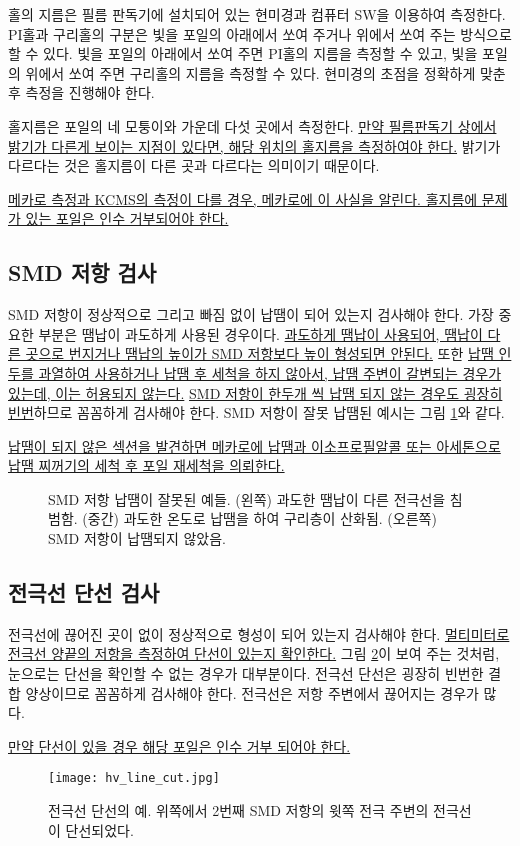 홀의 지름은 필름 판독기에 설치되어 있는 현미경과 컴퓨터 SW을 이용하여 측정한다. PI홀과 구리홀의 구분은 빛을 포일의 아래에서 쏘여 주거나 위에서 쏘여 주는 방식으로 할 수 있다. 빛을 포일의 아래에서 쏘여 주면 PI홀의 지름을 측정할 수 있고, 빛을 포일의 위에서 쏘여 주면 구리홀의 지름을 측정할 수 있다. 현미경의 초점을 정확하게 맞춘 후 측정을 진행해야 한다.

홀지름은 포일의 네 모퉁이와 가운데 다섯 곳에서 측정한다. \uline{만약 필름판독기 상에서 밝기가 다른게 보이는 지점이 있다면, 해당 위치의 홀지름을 측정하여야 한다.} 밝기가 다르다는 것은 홀지름이 다른 곳과 다르다는 의미이기 때문이다. 

\uline{메카로 측정과 KCMS의 측정이 다를 경우, 메카로에 이 사실을 알린다. 홀지름에 문제가 있는 포일은 인수 거부되어야 한다.}

\subsection{SMD 저항 검사}
SMD 저항이 정상적으로 그리고 빠짐 없이 납땜이 되어 있는지 검사해야 한다. 가장 중요한 부분은 땜납이 과도하게 사용된 경우이다. \uline{과도하게 땜납이 사용되어, 땜납이 다른 곳으로 번지거나 땜납의 높이가 SMD 저항보다 높이 형성되면 안된다.} 또한 \uline{납땜 인두를 과열하여 사용하거나 납땜 후 세척을 하지 않아서, 납땜 주변이 갈변되는 경우가 있는데, 이는 허용되지 않는다.} \uline{SMD 저항이 한두개 씩 납땜 되지 않는 경우도 굉장히 빈번}하므로 꼼꼼하게 검사해야 한다. SMD 저항이 잘못 납땜된 예시는 그림 \ref{fig:bad_solder}와 같다.

\uline{납땜이 되지 않은 섹션을 발견하면 메카로에 납땜과 이소프로필알콜 또는 아세톤으로 납땜 찌꺼기의 세척 후 포일 재세척을 의뢰한다.}

\begin{figure}[htb]
  \centering
  \caption[SMD 저항 납땜이 잘못된 예]{SMD 저항 납땜이 잘못된 예들. (왼쪽) 과도한 땜납이 다른 전극선을 침범함. (중간) 과도한 온도로 납땜을 하여 구리층이 산화됨. (오른쪽) SMD 저항이 납땜되지 않았음.}
  \label{fig:bad_solder}
\end{figure}

\subsection{전극선 단선 검사}
전극선에 끊어진 곳이 없이 정상적으로 형성이 되어 있는지 검사해야 한다. \uline{멀티미터로 전극선 양끝의 저항을 측정하여 단선이 있는지 확인한다.} 그림 \ref{fig:hv_line_cut}이 보여 주는 것처럼, 눈으로는 단선을 확인할 수 없는 경우가 대부분이다. 전극선 단선은 굉장히 빈번한 결합 양상이므로 꼼꼼하게 검사해야 한다. 전극선은 저항 주변에서 끊어지는 경우가 많다.

\uline{만약 단선이 있을 경우 해당 포일은 인수 거부 되어야 한다.}

\begin{figure}[htb]
  \centering
  \texttt{[image: hv\_line\_cut.jpg]}
  \caption[전극선 단선의 예]{전극선 단선의 예. 위쪽에서 2번째 SMD 저항의 윗쪽 전극 주변의 전극선이 단선되었다.}
  \label{fig:hv_line_cut}
\end{figure}


